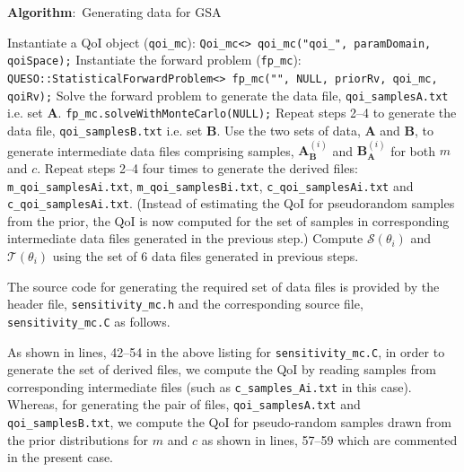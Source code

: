 \begin{algorithm}
\caption*{\textbf{Algorithm}:~Generating data for GSA}
\begin{algorithmic}[1]
\BState Instantiate a QoI object (\texttt{qoi\_mc}):
\Statex \texttt{Qoi\_mc<> qoi\_mc("qoi\_", paramDomain, qoiSpace);}
\BState Instantiate the forward problem (\texttt{fp\_mc}):
\Statex \texttt{QUESO::StatisticalForwardProblem<> fp\_mc("", NULL, priorRv, qoi\_mc, qoiRv);}
\BState Solve the forward problem to generate the data file, \texttt{qoi\_samplesA.txt} i.e. set $\bm A$.
\Statex \texttt{fp\_mc.solveWithMonteCarlo(NULL);}
\BState Repeat steps 2--4 to generate the data file, \texttt{qoi\_samplesB.txt} i.e. set $\bm B$.
\BState Use the two sets of data, $\bm A$ and $\bm B$, to generate intermediate data files comprising samples,
$\bm{A}^{(i)}_{\bm B}$ and $\bm{B}^{(i)}_{\bm A}$ for both $m$ and $c$.
\BState Repeat steps 2--4 four times to generate the derived files: \texttt{m\_qoi\_samplesAi.txt},
\texttt{m\_qoi\_samplesBi.txt}, \texttt{c\_qoi\_samplesAi.txt} and \texttt{c\_qoi\_samplesAi.txt}. (Instead
of estimating the QoI for pseudorandom samples from the prior, the QoI is now computed for the set of samples in
corresponding intermediate data files generated in the previous step.)
\BState Compute $\mathcal{S}(\theta_{i})$ and $\mathcal{T}(\theta_{i})$ using the set of 6 data files generated
in previous steps.
\EndProcedure
\end{algorithmic}
\end{algorithm}

The source code for generating the required set of data files is provided by the header file,
\texttt{sensitivity\_mc.h} and the corresponding source file, \texttt{sensitivity\_mc.C} as follows.





As shown in lines, 42--54 in the  above listing for \texttt{sensitivity\_mc.C}, in order to generate the set of derived files,
we compute the QoI by reading samples from corresponding intermediate files (such as \texttt{c\_samples\_Ai.txt} in this case).
Whereas, for generating the pair of files, \texttt{qoi\_samplesA.txt} and \texttt{qoi\_samplesB.txt}, we compute the QoI
for pseudo-random samples drawn from the prior distributions for $m$ and $c$ as shown in lines, 57--59 which are commented in
the present case.


